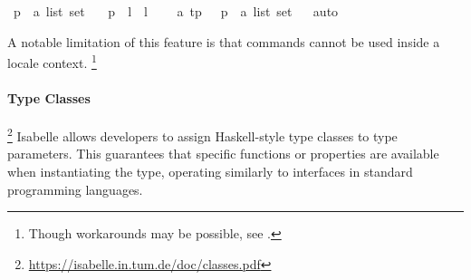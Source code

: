 \begin{isabellebody}\isanewline
{}\isamarkupfalse%
\ p\ {\isacharcolon}{\kern0pt}{\isacharcolon}{\kern0pt}\ {\isachardoublequoteopen}{\isacharparenleft}{\kern0pt}{\isacharprime}{\kern0pt}a\ list{\isacharparenright}{\kern0pt}\ set{\isachardoublequoteclose}\ \isanewline
\ \ {\isachardoublequoteopen}p\ {\isasymequiv}\ {\isacharbraceleft}{\kern0pt}l{\isachardot}{\kern0pt}\ {\isasymnot}\ {\isacharparenleft}{\kern0pt}l\ {\isacharequal}{\kern0pt}\ {\isacharbrackleft}{\kern0pt}{\isacharbrackright}{\kern0pt}{\isacharparenright}{\kern0pt}{\isacharbraceright}{\kern0pt}{\isachardoublequoteclose}\isanewline
\isanewline
{}\isamarkupfalse%
\ {\isacharparenleft}{\kern0pt}\ {\isacharprime}{\kern0pt}a\ tp\ \ {\isacharequal}{\kern0pt}\ {\isachardoublequoteopen}p\ {\isacharcolon}{\kern0pt}{\isacharcolon}{\kern0pt}\ {\isacharparenleft}{\kern0pt}{\isacharprime}{\kern0pt}a\ list{\isacharparenright}{\kern0pt}\ set{\isachardoublequoteclose}%
\ \isamarkupfalse%
\ auto%
\end{isabellebody}

A notable limitation of this feature is that  commands cannot be used inside a locale context.
\footnote{Though workarounds may be possible, see \cite{kunvcar2016types}.}

\paragraph{Type Classes}\footnote{\url{https://isabelle.in.tum.de/doc/classes.pdf}}
Isabelle allows developers to assign Haskell-style type classes to type parameters.
This guarantees that specific functions or properties are available when instantiating the type,
operating similarly to interfaces in standard programming languages.

